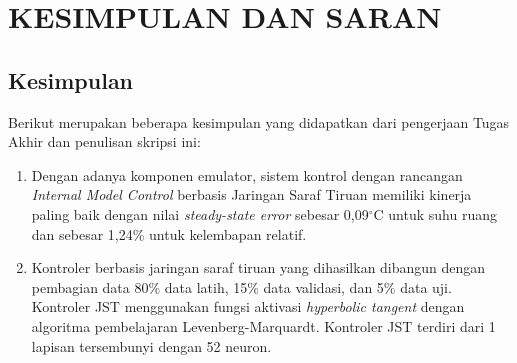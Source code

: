 \chapter{KESIMPULAN DAN SARAN}
\label{kesimpulan-dan-saran}



\section{Kesimpulan}

Berikut merupakan beberapa kesimpulan yang didapatkan dari pengerjaan Tugas Akhir dan penulisan skripsi ini:
\begin{enumerate}
	\item  Dengan adanya komponen emulator, sistem kontrol dengan rancangan \textit{Internal Model Control} berbasis Jaringan Saraf Tiruan memiliki kinerja paling baik dengan nilai \textit{steady-state error} sebesar 0,09$^\circ$C untuk suhu ruang dan sebesar 1,24\% untuk kelembapan relatif.
	\item Kontroler berbasis jaringan saraf tiruan yang dihasilkan dibangun dengan pembagian data 80\% data latih, 15\% data validasi, dan 5\% data uji. Kontroler JST menggunakan fungsi aktivasi \textit{hyperbolic tangent} dengan algoritma pembelajaran Levenberg-Marquardt. Kontroler JST terdiri dari 1 lapisan tersembunyi dengan 52 neuron.
\end{enumerate}

 


